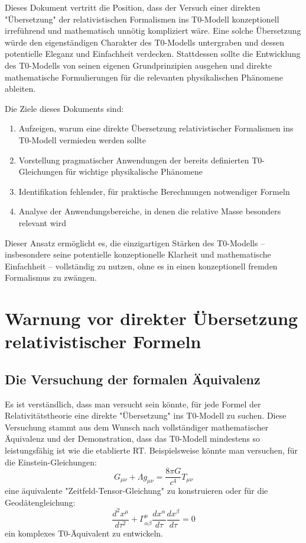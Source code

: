 \documentclass[12pt,a4paper]{article}
\begin{document}
	Dieses Dokument vertritt die Position, dass der Versuch einer direkten "Übersetzung" der relativistischen Formalismen ins T0-Modell konzeptionell irreführend und mathematisch unnötig kompliziert wäre. Eine solche Übersetzung würde den eigenständigen Charakter des T0-Modells untergraben und dessen potentielle Eleganz und Einfachheit verdecken. Stattdessen sollte die Entwicklung des T0-Modells von seinen eigenen Grundprinzipien ausgehen und direkte mathematische Formulierungen für die relevanten physikalischen Phänomene ableiten.
	
	Die Ziele dieses Dokuments sind:
	\begin{enumerate}
		\item Aufzeigen, warum eine direkte Übersetzung relativistischer Formalismen ins T0-Modell vermieden werden sollte
		\item Vorstellung pragmatischer Anwendungen der bereits definierten T0-Gleichungen für wichtige physikalische Phänomene
		\item Identifikation fehlender, für praktische Berechnungen notwendiger Formeln
		\item Analyse der Anwendungsbereiche, in denen die relative Masse besonders relevant wird
	\end{enumerate}
	
	Dieser Ansatz ermöglicht es, die einzigartigen Stärken des T0-Modells – insbesondere seine potentielle konzeptionelle Klarheit und mathematische Einfachheit – vollständig zu nutzen, ohne es in einen konzeptionell fremden Formalismus zu zwängen.
	
	\section{Warnung vor direkter Übersetzung relativistischer Formeln}
	\label{sec:warning}
	
	\subsection{Die Versuchung der formalen Äquivalenz}
	\label{subsec:temptation}
	
	Es ist verständlich, dass man versucht sein könnte, für jede Formel der Relativitätstheorie eine direkte "Übersetzung" ins T0-Modell zu suchen. Diese Versuchung stammt aus dem Wunsch nach vollständiger mathematischer Äquivalenz und der Demonstration, dass das T0-Modell mindestens so leistungsfähig ist wie die etablierte RT. Beispielsweise könnte man versuchen, für die Einstein-Gleichungen:
	\begin{equation}
		G_{\mu\nu} + \Lambda g_{\mu\nu} = \frac{8\pi G}{c^4} T_{\mu\nu}
	\end{equation}
	eine äquivalente "Zeitfeld-Tensor-Gleichung" zu konstruieren oder für die Geodätengleichung:
	\begin{equation}
		\frac{d^2 x^\mu}{d\tau^2} + \Gamma^\mu_{\alpha\beta} \frac{dx^\alpha}{d\tau} \frac{dx^\beta}{d\tau} = 0
	\end{equation}
	ein komplexes T0-Äquivalent zu entwickeln.
	
\end{document}
